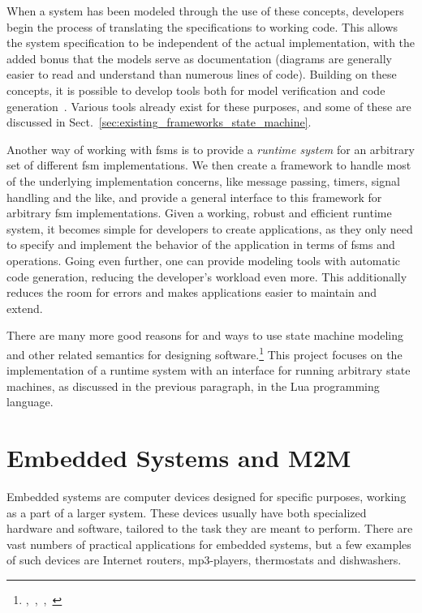 \noindent
When a system has been modeled through the use of these concepts, developers begin the process of translating the specifications to working code. This allows the system specification to be independent of the actual implementation, with the added bonus that the models serve as documentation (diagrams are generally easier to read and understand than numerous lines of code). Building on these concepts, it is possible to develop tools both for model verification and code generation~\cite{article:compositional_arctis}. Various tools already exist for these purposes, and some of these are discussed in Sect.~\ref{sec:existing_frameworks_state_machine}.

\noindent
Another way of working with \glspl{fsm} is to provide a \emph{runtime system} for an arbitrary set of different \gls{fsm} implementations. We then create a framework to handle most of the underlying implementation concerns, like message passing, timers, signal handling and the like, and provide a general interface to this framework for arbitrary \gls{fsm} implementations. Given a working, robust and efficient runtime system, it becomes simple for developers to create applications, as they only need to specify and implement the behavior of the application in terms of \glspl{fsm} and operations. Going even further, one can provide modeling tools with automatic code generation, reducing the developer's workload even more. This additionally reduces the room for errors and makes applications easier to maintain and extend.

\noindent
There are many more good reasons for and ways to use state machine modeling and other related semantics for designing software.\footnote{\cite{article:itut_methodologies},~\cite{chapter:structural_modeling_uml},~\cite{conference:system_analysis_modeling},~\cite{phd:frank}} This project focuses on the implementation of a runtime system with an interface for running arbitrary state machines, as discussed in the previous paragraph, in the Lua programming language.

\section{Embedded Systems and M2M}
\label{sec:embedded_m2m}
Embedded systems are computer devices designed for specific purposes, working as a part of a larger system. These devices usually have both specialized hardware and software, tailored to the task they are meant to perform. There are vast numbers of practical applications for embedded systems, but a few examples of such devices are Internet routers, mp3-players, thermostats and dishwashers.

